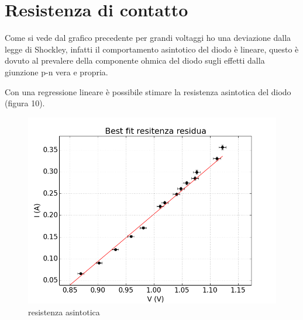\documentclass[a4paper,10pt]{article}
\begin{document}
\section{Resistenza di contatto}
Come si vede dal grafico precedente per grandi voltaggi ho una deviazione dalla legge di Shockley, infatti il comportamento asintotico del diodo è lineare, questo è dovuto al prevalere della componente ohmica del diodo sugli effetti dalla giunzione p-n vera e propria.

Con una regressione lineare è possibile stimare la resistenza asintotica del diodo (figura 10).

\begin{figure}[!htb]
\begin{center}
\includegraphics[width=\textwidth]{resistenzaResidua.png}
\end{center}
\caption{resistenza asintotica}
\end{figure}
\end{document}
